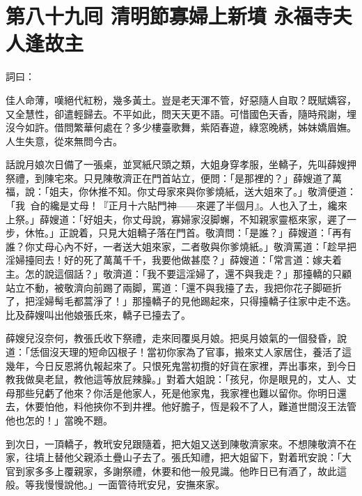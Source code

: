
\chapter*{第八十九囘 清明節寡婦上新墳 永福寺夫人逢故主}


詞曰：

\begin{myquote}
佳人命薄，嘆絕代紅粉，幾多黃土。豈是老天渾不管，好惡隨人自取？既賦嬌容，又全慧性，卻遣輕歸去。不平如此，問天天更不語。可惜國色天香，隨時飛謝，埋沒今如許。借問繁華何處在？多少樓臺歌舞，紫陌春遊，綠窓晚綉，姊妹嬌眉嫵。人生失意，從來無問今古。

\end{myquote}

話說月娘次日備了一張桌，並冥紙尺頭之類，大姐身穿孝服，坐轎子，先叫薛嫂押祭禮，到陳宅來。只見陳敬濟正在門首站立，便問：「是那裡的？」薛嫂道了萬福，說：「姐夫，你休推不知。你丈母家來與你爹燒紙，送大姐來了。」{}敬濟便道：「我𩫻𩫵㒲的纔是丈母！{}『正月十六貼門神——來遲了半個月』。人也入了土，纔來上祭。」薛嫂道：「好姐夫，你丈母說，寡婦家沒脚蠏，不知親家靈柩來家，遲了一步，休恠。」正說着，只見大姐轎子落在門首。敬濟問：「是誰？」薛嫂道：「再有誰？你丈母心內不好，一者送大姐來家，二者敬與你爹燒紙。」敬濟罵道：「趁早把淫婦擡囘去！好的死了萬萬千千，我要他做甚麼？」{}薛嫂道：「常言道：嫁夫着主。怎的說這個話？」敬濟道：「我不要這淫婦了，還不與我走？」那擡轎的只顧站立不動，被敬濟向前踢了兩脚，罵道：「還不與我擡了去，我把你花子脚砸折了，把淫婦髩毛都蒿淨了！」那擡轎子的見他踢起來，只得擡轎子往家中走不迭。比及薛嫂叫出他娘張氏來，轎子已擡去了。

薛嫂兒沒奈何，教張氏收下祭禮，走來囘覆吳月娘。把吳月娘氣的一個發昏，說道：「恁個沒天理的短命囚根子！當初你家為了官事，搬來丈人家居住，養活了這幾年，今日反恩將仇報起來了。只恨死鬼當初攬的好貨在家裡，弄出事來，到今日教我做臭老鼠，教他這等放屁辣臊。」{}對着大姐說：「孩兒，你是眼見的，丈人、丈母那些兒虧了他來？你活是他家人，死是他家鬼，我家裡也難以留你。你明日還去，休要怕他，料他挾你不到井裡。他好膽子，恆是殺不了人，{}難道世間沒王法管他也怎的！」當晚不題。

到次日，一頂轎子，教玳安兒跟隨着，把大姐又送到陳敬濟家來。不想陳敬濟不在家，往墳上替他父親添土疊山子去了。張氏知禮，把大姐留下，對着玳安說：「大官到家多多上覆親家，多謝祭禮，休要和他一般見識。他昨日已有酒了，故此這般。等我慢慢說他。」一面管待玳安兒，安撫來家。

